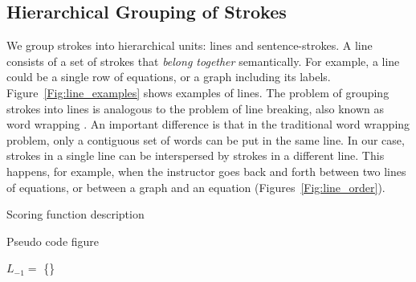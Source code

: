 \subsection{Hierarchical Grouping of Strokes}
We group strokes into hierarchical units: lines and sentence-strokes.  
A line consists of a set of strokes that \textit{belong together} semantically. For example, a line could be a single row of equations, or a graph including its labels. Figure~\ref{Fig:line_examples} shows examples of lines. The problem of grouping strokes into lines is analogous to the problem of line breaking, also known as word wrapping \cite{knuth1981breaking}. An important difference is that in the traditional word wrapping problem, only a contiguous set of words can be put in the same line. In our case, strokes in a single line can be interspersed by strokes in a different line. This happens, for example, when the instructor goes back and forth between two lines of equations, or between a graph and an equation (Figures~\ref{Fig:line_order}). 

Scoring function description

Pseudo code figure
\begin{algorithm}[h]
\DontPrintSemicolon
\SetAlgoLined
\SetCommentSty{\small\ttfamily} 
  $L_{-1} =$ \{\} \;

\end{algorithm}

